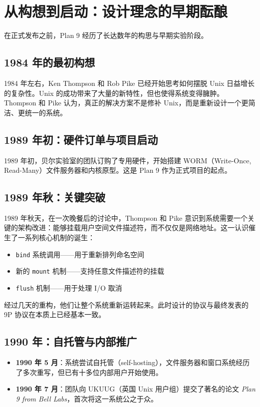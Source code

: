 \documentclass[12pt,UTF8]{ctexbook}
\begin{document}
\section{从构想到启动：设计理念的早期酝酿}

在正式发布之前，Plan 9 经历了长达数年的构思与早期实验阶段。

\subsection{1984 年的最初构想}

1984 年左右，Ken Thompson 和 Rob Pike 已经开始思考如何摆脱 Unix 日益增长的复杂性。Unix 的成功带来了大量的新特性，但也使得系统变得臃肿。Thompson 和 Pike 认为，真正的解决方案不是修补 Unix，而是重新设计一个更简洁、更统一的系统。

\subsection{1989 年初：硬件订单与项目启动}

1989 年初，贝尔实验室的团队订购了专用硬件，开始搭建 WORM（Write-Once, Read-Many）文件服务器和内核原型。这是 Plan 9 作为正式项目的起点。

\subsection{1989 年秋：关键突破}

1989 年秋天，在一次晚餐后的讨论中，Thompson 和 Pike 意识到系统需要一个关键的架构改进：能够挂载用户空间文件描述符，而不仅仅是网络地址。这一认识催生了一系列核心机制的诞生：

\begin{itemize}
\item \texttt{bind} 系统调用——用于重新排列命名空间
\item 新的 \texttt{mount} 机制——支持任意文件描述符的挂载
\item \texttt{flush} 机制——用于处理 I/O 取消
\end{itemize}

经过几天的重构，他们让整个系统重新运转起来。此时设计的协议与最终发表的 9P 协议在本质上已经基本一致。

\subsection{1990 年：自托管与内部推广}

\begin{itemize}
\item \textbf{1990 年 5 月}：系统尝试自托管（self-hosting），文件服务器和窗口系统经历了多次重写，但已有十多位内部用户开始使用。
\item \textbf{1990 年 7 月}：团队向 UKUUG（英国 Unix 用户组）提交了著名的论文 \textit{Plan 9 from Bell Labs}，首次将这一系统公之于众。
\end{itemize}
	
\end{document}
